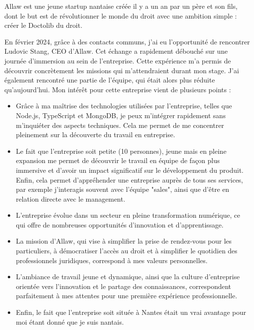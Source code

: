 Allaw est une jeune startup nantaise créée il y a un an par un père et son fils,
dont le but est de révolutionner le monde du droit avec une ambition simple :
créer le Doctolib du droit.

En février 2024, grâce à des contacts communs, j'ai eu l'opportunité de rencontrer Ludovic Stang, CEO d'Allaw.
Cet échange a rapidement débouché sur une journée d'immersion au sein de l'entreprise.
Cette expérience m'a permis de découvrir concrètement les missions qui m'attendraient durant mon stage.
J'ai également rencontré une partie de l'équipe, qui était alors plus réduite qu'aujourd'hui.
Mon intérêt pour cette entreprise vient de plusieurs points :

\begin{itemize}
  \item Grâce à ma maîtrise des technologies utilisées par l'entreprise, telles que Node.js, TypeScript et MongoDB, je peux m'intégrer rapidement sans m'inquiéter des aspects techniques.
Cela me permet de me concentrer pleinement sur la découverte du travail en entreprise.

  \item Le fait que l'entreprise soit petite (10 personnes), jeune mais en pleine
expansion me permet de découvrir le travail en équipe de façon plus immersive
et d'avoir un impact significatif sur le développement du produit. Enfin, cela
permet d'appréhender une entreprise auprès de tous ses services, par exemple
j'interagis souvent avec l'équipe "sales", ainsi que d'être en relation directe
avec le management.

  \item L'entreprise évolue dans un secteur en pleine transformation numérique,
ce qui offre de nombreuses opportunités d'innovation et d'apprentissage.

  \item La mission d'Allaw, qui vise à simplifier la prise de rendez-vous pour les
particuliers, à démocratiser l'accès au droit et à simplifier le quotidien des
professionnels juridiques, correspond à mes valeurs personnelles.

  \item L'ambiance de travail jeune et dynamique, ainsi que la culture d'entreprise
orientée vers l'innovation et le partage des connaissances, correspondent
parfaitement à mes attentes pour une première expérience professionnelle.

  \item Enfin, le fait que l'entreprise soit située à Nantes était un vrai
avantage pour moi étant donné que je suis nantais.
\end{itemize}

